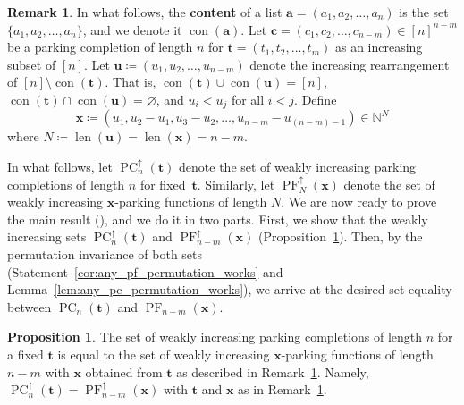 \documentclass{amsart}
\theoremstyle{definition}
\newtheorem{proposition}[theorem]{Proposition}
\newtheorem{remark}[theorem]{Remark}
\numberwithin{equation}{section}
\newcommand{\PF}{\operatorname{PF}} %
\newcommand{\PC}{\operatorname{PC}} %
\begin{document}
\begin{remark}\label{rem:find_x_from_t}
    In what follows, the \textbf{content} of a list $\mathbf{a} = (a_1, a_2, \hdots, a_n)$ is the set $\{a_1,a_2,\ldots,a_n\}$, and we denote it $\operatorname{con}(\mathbf{a})$.
    Let $\mathbf{c} = (c_1, c_2, \hdots, c_{n-m}) \in [n]^{n-m}$ be a parking completion of length $n$ for $\mathbf{t} = (t_1, t_2, \hdots, t_m)$ as an increasing subset of $[n]$.
    Let $\mathbf{u} \coloneqq (u_1, u_2, \hdots, u_{n-m})$ denote the increasing rearrangement of $[n] \setminus \operatorname{con}(\mathbf{t})$.
    That is, $\operatorname{con}(\mathbf{t}) \cup \operatorname{con}(\mathbf{u}) = [n]$, $\operatorname{con}(\mathbf{t}) \cap \operatorname{con}(\mathbf{u}) = \varnothing$, and $u_i < u_j$ for all $i < j$.    
    Define 
    \[
    \mathbf{x} \coloneqq (u_1, u_2 - u_1, u_3 - u_2, \hdots, u_{n-m} - u_{(n-m)-1}) \in \mathbb{N}^{N}
    \]
    where $N \coloneqq \operatorname{len}(\mathbf{u}) = \operatorname{len}(\mathbf{x}) = n-m$.
\end{remark}

In what follows, let $\PC_{n}^\uparrow(\mathbf{t})$ denote the set of weakly increasing parking completions of length $n$ for fixed~$\mathbf{t}$.
Similarly, let $\PF_{N}^\uparrow(\mathbf{x})$ denote the set of weakly increasing $\mathbf{x}$-parking functions of length $N$.
We are now ready to prove the main result (), and we do it in two parts. First, we show that the weakly increasing sets $\PC_{n}^\uparrow(\mathbf{t})$ and $\PF_{n-m}^\uparrow(\mathbf{x})$ (Proposition~\ref{prop:weakly_increasing_sets_are_equal}). 
Then, by the permutation invariance of both sets (Statement~\eqref{cor:any_pf_permutation_works} and Lemma~\ref{lem:any_pc_permutation_works}), we arrive at the desired set equality between $\PC_{n}(\mathbf{t})$ and $\PF_{n-m}(\mathbf{x})$.


\begin{proposition}\label{prop:weakly_increasing_sets_are_equal}
    The set of weakly increasing parking completions of length $n$ for a fixed $\mathbf{t}$ is equal to the set of weakly increasing $\mathbf{x}$-parking functions of length $n-m$ with $\mathbf{x}$ obtained from $\mathbf{t}$ as described in Remark~\ref{rem:find_x_from_t}.
    Namely, $\PC_{n}^\uparrow(\mathbf{t}) = \PF_{n-m}^\uparrow(\mathbf{x})$ with $\mathbf{t}$ and $\mathbf{x}$ as in Remark~\ref{rem:find_x_from_t}.
\end{proposition}
\end{document}
